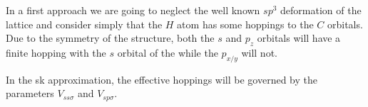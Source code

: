 In a first approach we are going to neglect the well known $sp^3$ deformation of the lattice\cite{Duplock2004,Yazyev2007,Castro2009a,Gmitra2013} and consider simply that the $H$ atom has some hoppings to the $C$ orbitals. Due to the symmetry of the structure, both the $s$ and $p_z$ orbitals will have a finite hopping with the $s$ orbital of the  while the $p_{x/y}$ will not.

In the \ac{sk} approximation, the effective hoppings will be governed by the parameters $V_{ss\sigma}$ and $V_{sp\sigma}$.


%
%
%
%
%
%
%
%
%



